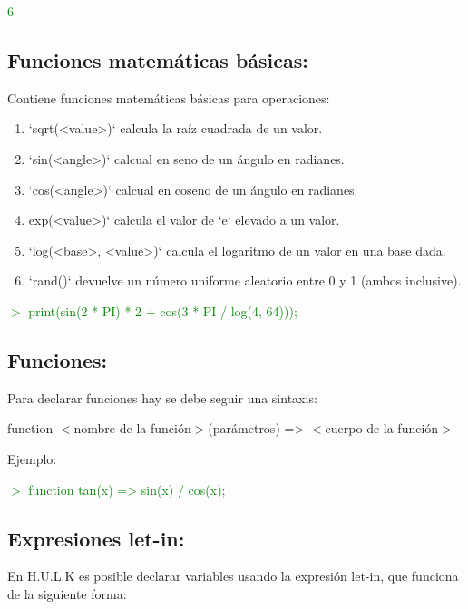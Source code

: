 \documentclass[a4paper,12pt]{article}
\begin{document}
    \textcolor{green}{6}

    \subsection{Funciones matemáticas básicas:}\label{sub:mathExpressions}
    \begin{flushleft}
        Contiene funciones matemáticas básicas para operaciones:
        
        \begin{enumerate}
            \item `sqrt(<value>)` calcula la raíz cuadrada de un valor.
            \item `sin(<angle>)` calcual en seno de un ángulo en radianes.
            \item `cos(<angle>)` calcual en coseno de un ángulo en radianes.
            \item exp(<value>)` calcula el valor de `e` elevado a un valor.
            \item `log(<base>, <value>)` calcula el logaritmo de un valor en una base dada.
            \item `rand()` devuelve un número uniforme aleatorio entre 0 y 1 (ambos inclusive).
        \end{enumerate}
    \end{flushleft}

    \textcolor{green}{$>$ print(sin(2 * PI) * 2 + cos(3 * PI / log(4, 64)));}
    
    \subsection{Funciones:}\label{sub:functions}
    \begin{flushleft}
        Para declarar funciones hay se debe seguir una sintaxis:

        function $<$nombre de la función$>$(parámetros) =>  $<$cuerpo de la función$>$

    \end{flushleft}
    Ejemplo:

    \textcolor{green}{$>$ function tan(x) => sin(x) / cos(x);}

    \newpage

    \subsection{Expresiones let-in:}\label{sub:letin}
    \begin{flushleft}
        En H.U.L.K es posible declarar variables usando la expresión let-in, que funciona de la siguiente forma:
    \end{flushleft}
\end{document}
